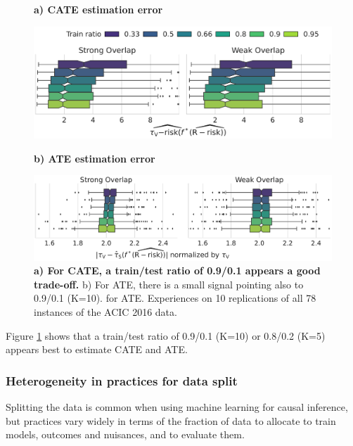 \documentclass[a4paper,num-refs]{oup-contemporary}%
\begin{document}
\begin{figure}[!t]
    \begin{minipage}{.5\textwidth}
        \centerline{\textbf{a) CATE estimation error}}
        \includegraphics[width=\linewidth]{_5_train_size_r_risk__cate__acic16_2cols.pdf}
    \end{minipage}
    \begin{minipage}{.5\textwidth}
        \centerline{\textbf{b) ATE estimation error}}
        \includegraphics[width=\linewidth]{_5_train_size_r_risk__ate__acic16_2cols.pdf}
    \end{minipage}%
    \caption{\textbf{a) For CATE, a train/test ratio of 0.9/0.1 appears a good
            trade-off.} b) For ATE, there is a small signal pointing also to
        0.9/0.1 (K=10).
        for ATE. Experiences on 10 replications of all 78 instances of the ACIC 2016
        data.}\label{fig:train_test_ratio}
\end{figure}

Figure \ref{fig:train_test_ratio} shows that a train/test ratio of
0.9/0.1 (K=10) or 0.8/0.2 (K=5) appears best to estimate CATE and
ATE.

\subsubsection{Heterogeneity in practices for data split}\label{apd:results:k_fold_choices}

Splitting the data is common when using machine learning for causal
inference, but practices vary widely in terms of the fraction of data to
allocate to train models, outcomes and nuisances, and to evaluate them.
\end{document}
